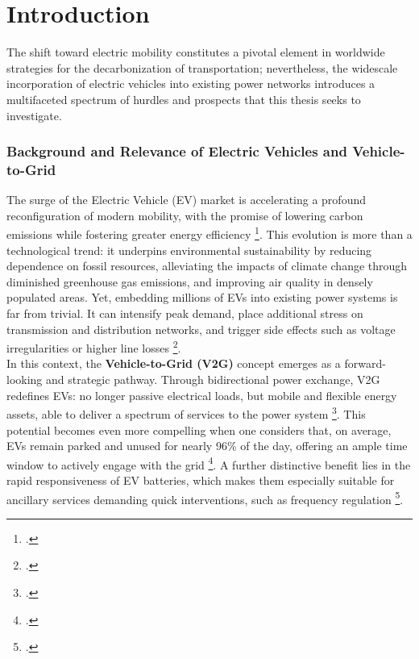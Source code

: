 \chapter{Introduction}
The shift toward electric mobility constitutes a pivotal element in worldwide strategies for the decarbonization of transportation; nevertheless, the widescale incorporation of electric vehicles into existing power networks introduces a multifaceted spectrum of hurdles and prospects that this thesis seeks to investigate.


\subsection{Background and Relevance of Electric Vehicles and Vehicle-to-Grid} %
The surge of the Electric Vehicle (EV) market is accelerating a profound reconfiguration of modern mobility, with the promise of lowering carbon emissions while fostering greater energy efficiency \footcite{orfanoudakis2022deep}. 
This evolution is more than a technological trend: it underpins environmental sustainability by reducing dependence on fossil resources, alleviating the impacts of climate change through diminished greenhouse gas emissions, and improving air quality in densely populated areas. 
Yet, embedding millions of EVs into existing power systems is far from trivial. 
It can intensify peak demand, place additional stress on transmission and distribution networks, and trigger side effects such as voltage irregularities or higher line losses \footcite{orfanoudakis2022deep, salvatti2020electric}.
\\
\noindent
In this context, the \textbf{Vehicle-to-Grid (V2G)} concept emerges as a forward-looking and strategic pathway. 
Through bidirectional power exchange, V2G redefines EVs: no longer passive electrical loads, but mobile and flexible energy assets, able to deliver a spectrum of services to the power system \footcite{alfaverh2022optimal}. 
This potential becomes even more compelling when one considers that, on average, EVs remain parked and unused for nearly 96\% of the day, offering an ample time window to actively engage with the grid \footcite{evertsson2024investigating}. 
A further distinctive benefit lies in the rapid responsiveness of EV batteries, which makes them especially suitable for ancillary services demanding quick interventions, such as frequency regulation \footcite{alfaverh2022optimal}. 
